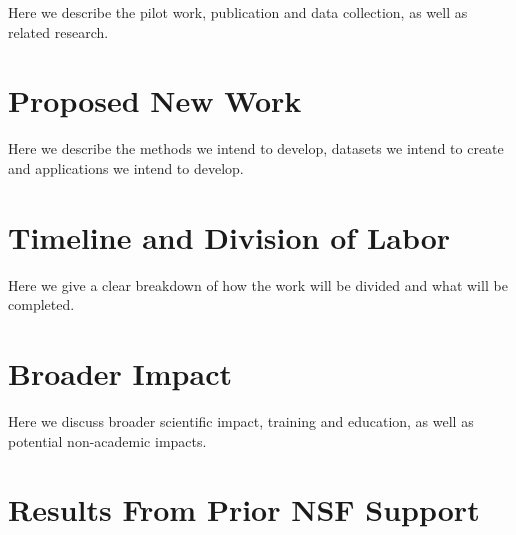 Here we describe the pilot work, publication and data collection, as well as related research.

\section{Proposed New Work}

Here we describe the methods we intend to develop, datasets we intend to create and applications we intend to develop.

\section{Timeline and Division of Labor}

Here we give a clear breakdown of how the work will be divided and what will be completed.

\section{Broader Impact}

Here we discuss broader scientific impact, training and education, as well as potential non-academic impacts.

\section{Results From Prior NSF Support}




